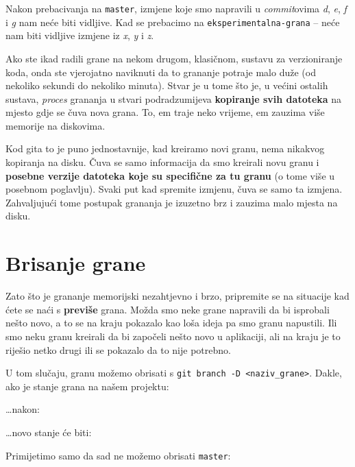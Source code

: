 Nakon prebacivanja na \verb+master+, izmjene koje smo napravili u \emph{commit}ovima \emph d, \emph e, \emph f i \emph g nam neće biti vidljive.
Kad se prebacimo na \verb+eksperimentalna-grana+ -- neće nam biti vidljive izmjene iz \emph x, \emph y i \emph z.

Ako ste ikad radili grane na nekom drugom, klasičnom, sustavu za verzioniranje koda, onda ste vjerojatno naviknuti da to grananje potraje malo duže (od nekoliko sekundi do nekoliko minuta).
Stvar je u tome što je, u većini ostalih sustava, \emph{proces} grananja u stvari podradzumijeva \textbf{kopiranje svih datoteka} na mjesto gdje se čuva nova grana.
To, em traje neko vrijeme, em zauzima više memorije na diskovima.

Kod gita to je puno jednostavnije, kad kreiramo novi granu, nema nikakvog kopiranja na disku. 
Čuva se samo informacija da smo kreirali novu granu i \textbf{posebne verzije datoteka koje su specifične za tu granu} (o tome više u posebnom poglavlju).
Svaki put kad spremite izmjenu, čuva se samo ta izmjena.
Zahvaljujući tome postupak grananja je izuzetno brz i zauzima malo mjesta na disku.

\section*{Brisanje grane}

Zato što je grananje memorijski nezahtjevno i brzo, pripremite se na situacije kad ćete se naći s \textbf{previše} grana.
Možda smo neke grane napravili da bi isprobali nešto novo, a to se na kraju pokazalo kao loša ideja pa smo granu napustili.
Ili smo neku granu kreirali da bi započeli nešto novo u aplikaciji, ali na kraju je to riješio netko drugi ili se pokazalo da to nije potrebno.

U tom slučaju, granu možemo obrisati s \verb+git branch -D <naziv_grane>+. 
Dakle, ako je stanje grana na našem projektu:



\dots{}nakon:



\dots{}novo stanje će biti:



Primijetimo samo da sad ne možemo obrisati \verb+master+:



